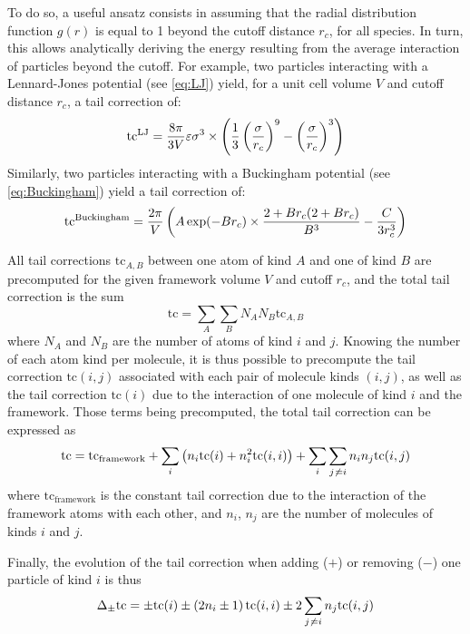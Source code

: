 \documentclass[main.tex]{subfiles}
\begin{document}
To do so, a useful ansatz consists in assuming that the radial distribution function $g(r)$ is equal to 1 beyond the cutoff distance $r_c$, for all species. In turn, this allows analytically deriving the energy resulting from the average interaction of particles beyond the cutoff. For example, two particles interacting with a Lennard-Jones potential (see \cref{eq:LJ}) yield, for a unit cell volume $V$ and cutoff distance $r_c$, a tail correction of:
\[\text{tc}^\text{LJ} = \frac{8\pi}{3V}\varepsilon\sigma^3\times\left(\frac13\left(\frac{\sigma}{r_c}\right)^9 - \left(\frac{\sigma}{r_c}\right)^3\right)\]
Similarly, two particles interacting with a Buckingham potential (see \cref{eq:Buckingham}) yield a tail correction of:
\[\text{tc}^\text{Buckingham} = \frac{2\pi}V \left(A\exp(-Br_c)\times\frac{2 + Br_c(2 + Br_c)}{B^3} - \frac C{3r_c^3}\right)\]

All tail corrections $\text{tc}_{A,B}$ between one atom of kind $A$ and one of kind $B$ are precomputed for the given framework volume $V$ and cutoff $r_c$, and the total tail correction is the sum
\[\text{tc} = \sum_A\sum_B N_AN_B\text{tc}_{A,B}\]
where $N_A$ and $N_B$ are the number of atoms of kind $i$ and $j$. Knowing the number of each atom kind per molecule, it is thus possible to precompute the tail correction $\text{tc}(i,j)$ associated with each pair of molecule kinds $(i,j)$, as well as the tail correction $\text{tc}(i)$ due to the interaction of one molecule of kind $i$ and the framework. Those terms being precomputed, the total tail correction can be expressed as
\[\text{tc} = \text{tc}_\text{framework} + \sum_i \left(n_i\text{tc}(i) + n_i^2\text{tc}(i,i)\right) + \sum_i\sum_{j\not\kern0.2ex= i} n_in_j\text{tc}(i,j)\]
where $\text{tc}_\text{framework}$ is the constant tail correction due to the interaction of the framework atoms with each other, and $n_i$, $n_j$ are the number of molecules of kinds $i$ and $j$.

Finally, the evolution of the tail correction when adding ($+$) or removing ($-$) one particle of kind $i$ is thus
\[\Delta_{\pm}\text{tc} = \pm\text{tc}(i) \pm\left(2n_i\pm1\right)\text{tc}(i,i) \pm 2\sum_{j\not\kern0.2ex= i} n_j\text{tc}(i,j)\]
\end{document}
